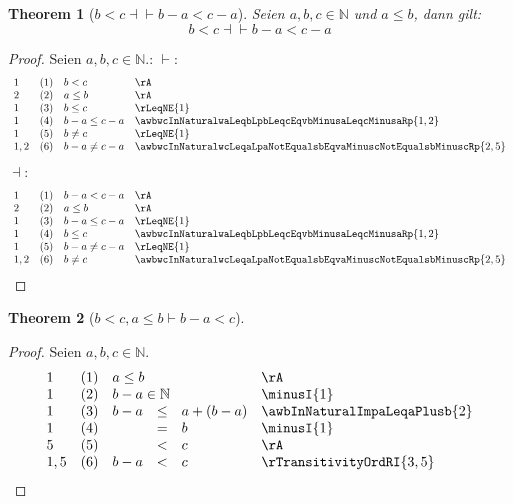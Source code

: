 \documentclass{book}
\theoremstyle{plain}
\newtheorem{theorem}{Theorem}
\theoremstyle{remark}
\theoremstyle{definition}
\begin{document}
\label{awbwcInNaturalwaLeqbLpbLneqcEqvbMinusaLneqcMinusaRp}
\begin{theorem}[\(b<c \dashv\vdash b-a<c-a\)]
Seien \(a,b,c\in\mathbb{N}\) und \(a\leq b\), dann gilt:
\[b<c \dashv\vdash b-a<c-a\]
\end{theorem}
\begin{proof}
Seien \(a,b,c\in\mathbb{N}\).:
    \(\vdash\):
    \[
    \begin{array}{llll}
        1 & (1) & b<c  & \rA \\
        2 & (2) & a\leq b  & \rA \\
        1 & (3) & b\leq c  & \rLeqNE{1} \\
        1 & (4) & b-a\leq c-a  & \awbwcInNaturalwaLeqbLpbLeqcEqvbMinusaLeqcMinusaRp{1,2} \\
        1 & (5) & b\neq c  & \rLeqNE{1} \\
      1,2 & (6) & b-a\neq c-a  & \awbwcInNaturalwcLeqaLpaNotEqualsbEqvaMinuscNotEqualsbMinuscRp{2,5} \\
    \end{array}
    \]
    \(\dashv\):
    \[
    \begin{array}{llll}
        1 & (1) & b-a<c-a  & \rA \\
        2 & (2) & a\leq b  & \rA \\
        1 & (3) & b-a\leq c-a  & \rLeqNE{1} \\
        1 & (4) & b\leq c  & \awbwcInNaturalwaLeqbLpbLeqcEqvbMinusaLeqcMinusaRp{1,2} \\
        1 & (5) & b-a\neq c-a  & \rLeqNE{1} \\
      1,2 & (6) & b\neq c  & \awbwcInNaturalwcLeqaLpaNotEqualsbEqvaMinuscNotEqualsbMinuscRp{2,5} \\
    \end{array}
    \]
\end{proof}

\label{bLneqcwaLeqbImpbMinusaLneqc}
\begin{theorem}[\(b<c, a\leq b\vdash b-a<c\)]
\end{theorem}
\begin{proof}
Seien \(a, b, c \in \mathbb{N}\). 
\[
\begin{array}{llclll}
          1  & (1) & \multicolumn{3}{l}{a\leq b}  & \rA \\
          1  & (2) & \multicolumn{3}{l}{b-a\in\mathbb{N}}  & \minusI{1} \\
          1  & (3) & b-a&\leq& a+(b-a)  & \awbInNaturalImpaLeqaPlusb{2} \\
          1  & (4) & &=& b  & \minusI{1} \\
          5  & (5) & &< & c  & \rA \\
          1,5& (6) & b-a&<& c  & \rTransitivityOrdRI{3,5} \\
\end{array}
\]
\end{proof}
\end{document}
